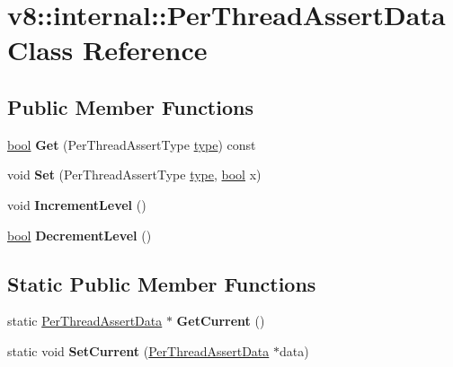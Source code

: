 \hypertarget{classv8_1_1internal_1_1PerThreadAssertData}{}\section{v8\+:\+:internal\+:\+:Per\+Thread\+Assert\+Data Class Reference}
\label{classv8_1_1internal_1_1PerThreadAssertData}
\subsection*{Public Member Functions}
\begin{DoxyCompactItemize}
\item 
\mbox{\label{classv8_1_1internal_1_1PerThreadAssertData_a2dd8215fe595dc5dfcf9a60ebd89a379}} 
\mbox{\hyperlink{classbool}{bool}} {\bfseries Get} (Per\+Thread\+Assert\+Type \mbox{\hyperlink{classstd_1_1conditional_1_1type}{type}}) const
\item 
\mbox{\label{classv8_1_1internal_1_1PerThreadAssertData_ac8832ba0e67fd3dba9c76251d56e808a}} 
void {\bfseries Set} (Per\+Thread\+Assert\+Type \mbox{\hyperlink{classstd_1_1conditional_1_1type}{type}}, \mbox{\hyperlink{classbool}{bool}} x)
\item 
\mbox{\label{classv8_1_1internal_1_1PerThreadAssertData_a5d75f7c4553a5e46a03ff159439d33cf}} 
void {\bfseries Increment\+Level} ()
\item 
\mbox{\label{classv8_1_1internal_1_1PerThreadAssertData_a84e645d60ac3091382890e23d5f06362}} 
\mbox{\hyperlink{classbool}{bool}} {\bfseries Decrement\+Level} ()
\end{DoxyCompactItemize}
\subsection*{Static Public Member Functions}
\begin{DoxyCompactItemize}
\item 
\mbox{\label{classv8_1_1internal_1_1PerThreadAssertData_af3344279ed8a6ac370bf08bc05b46f8e}} 
static \mbox{\hyperlink{classv8_1_1internal_1_1PerThreadAssertData}{Per\+Thread\+Assert\+Data}} $\ast$ {\bfseries Get\+Current} ()
\item 
\mbox{\label{classv8_1_1internal_1_1PerThreadAssertData_ae456804fb82cbc7becfac05aaa3996b3}} 
static void {\bfseries Set\+Current} (\mbox{\hyperlink{classv8_1_1internal_1_1PerThreadAssertData}{Per\+Thread\+Assert\+Data}} $\ast$data)
\end{DoxyCompactItemize}


